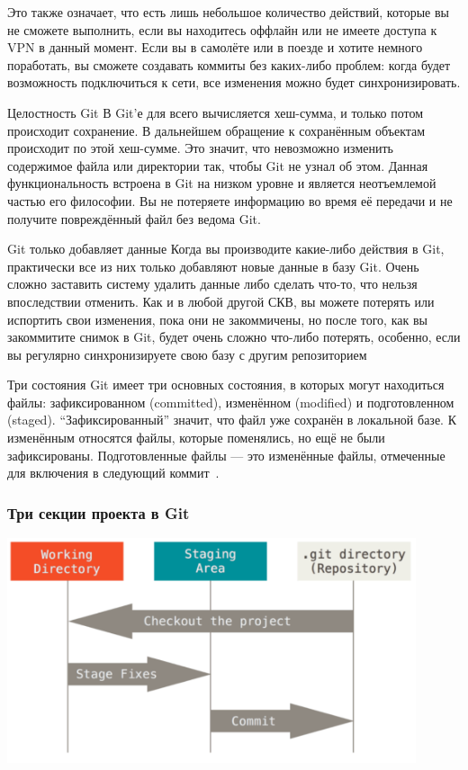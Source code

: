 \documentclass{../industrial-development}
\begin{document}
Это также означает, что есть лишь небольшое количество действий, которые вы не сможете выполнить, если вы находитесь оффлайн или не имеете доступа к VPN в данный момент. Если вы в самолёте или в поезде и хотите немного поработать, вы сможете создавать коммиты без каких-либо проблем: когда будет возможность подключиться к сети, все изменения можно будет синхронизировать.

Целостность Git
В Git’е для всего вычисляется хеш-сумма, и только потом происходит сохранение. В дальнейшем обращение к сохранённым объектам происходит по этой хеш-сумме. Это значит, что невозможно изменить содержимое файла или директории так, чтобы Git не узнал об этом. Данная функциональность встроена в Git на низком уровне и является неотъемлемой частью его философии. Вы не потеряете информацию во время её передачи и не получите повреждённый файл без ведома Git.

Git только добавляет данные
Когда вы производите какие-либо действия в Git, практически все из них только добавляют новые данные в базу Git. Очень сложно заставить систему удалить данные либо сделать что-то, что нельзя впоследствии отменить. Как и в любой другой СКВ, вы можете потерять или испортить свои изменения, пока они не закоммичены, но после того, как вы закоммитите снимок в Git, будет очень сложно что-либо потерять, особенно, если вы регулярно синхронизируете свою базу с другим репозиторием

Три состояния
Git имеет три основных состояния, в которых могут находиться файлы: зафиксированном (committed), изменённом (modified) и подготовленном (staged). “Зафиксированный” значит, что файл уже сохранён в локальной базе. К изменённым относятся файлы, которые поменялись, но ещё не были зафиксированы. Подготовленные файлы — это изменённые файлы, отмеченные для включения в следующий коммит~\cite[с.~8-10]{ProGit}.

\begin{frame} \frametitle{Три секции проекта в Git}
  \centerline{\includegraphics[width=0.9\textwidth]{GitSections.pdf}}
\end{frame}
\end{document}
